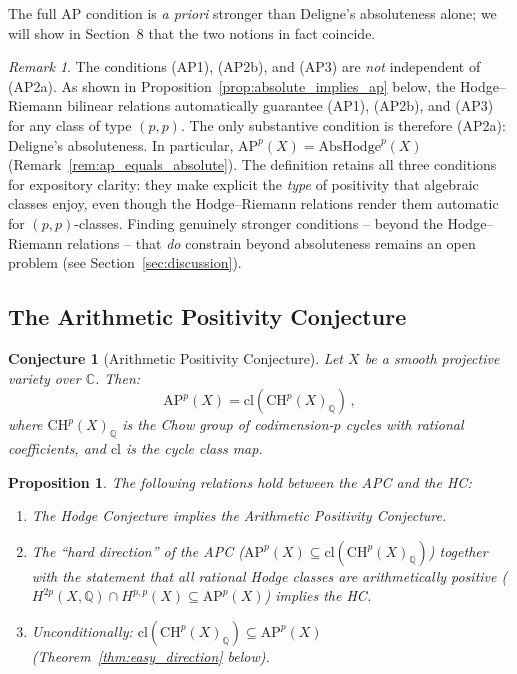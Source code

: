 \documentclass[aps,prd,twocolumn,superscriptaddress,nofootinbib]{revtex4-2}
\newtheorem{proposition}[theorem]{Proposition}
\newtheorem{conjecture}[theorem]{Conjecture}
\theoremstyle{definition}
\theoremstyle{remark}
\newtheorem{remark}[theorem]{Remark}
\begin{document}
The full AP condition is \emph{a priori} stronger than Deligne's absoluteness alone; we will show in Section~8 that the two notions in fact coincide.

\begin{remark}
\label{rem:redundancy}
The conditions (AP1), (AP2b), and (AP3) are \textit{not} independent of (AP2a). As shown in Proposition~\ref{prop:absolute_implies_ap} below, the Hodge--Riemann bilinear relations automatically guarantee (AP1), (AP2b), and (AP3) for any class of type $(p,p)$. The only substantive condition is therefore (AP2a): Deligne's absoluteness. In particular, $\mathrm{AP}^p(X) = \mathrm{AbsHodge}^p(X)$ (Remark~\ref{rem:ap_equals_absolute}). The definition retains all three conditions for expository clarity: they make explicit the \textit{type} of positivity that algebraic classes enjoy, even though the Hodge--Riemann relations render them automatic for $(p,p)$-classes. Finding genuinely stronger conditions -- beyond the Hodge--Riemann relations -- that \textit{do} constrain beyond absoluteness remains an open problem (see Section~\ref{sec:discussion}).
\end{remark}

\subsection{The Arithmetic Positivity Conjecture}

\begin{conjecture}[Arithmetic Positivity Conjecture]
\label{conj:AP}
Let $X$ be a smooth projective variety over $\mathbb{C}$. Then:
\begin{equation}
\mathrm{AP}^p(X) = \mathrm{cl}\!\left(\mathrm{CH}^p(X)_\mathbb{Q}\right)\,,
\end{equation}
where $\mathrm{CH}^p(X)_\mathbb{Q}$ is the Chow group of codimension-$p$ cycles with rational coefficients, and $\mathrm{cl}$ is the cycle class map.
\end{conjecture}

\begin{proposition}
\label{prop:equivalence}
The following relations hold between the APC and the HC:
\begin{enumerate}
\item The Hodge Conjecture implies the Arithmetic Positivity Conjecture.
\item The ``hard direction'' of the APC ($\mathrm{AP}^p(X) \subseteq \mathrm{cl}(\mathrm{CH}^p(X)_\mathbb{Q})$) together with the statement that all rational Hodge classes are arithmetically positive ($H^{2p}(X, \mathbb{Q}) \cap H^{p,p}(X) \subseteq \mathrm{AP}^p(X)$) implies the HC.
\item Unconditionally: $\mathrm{cl}(\mathrm{CH}^p(X)_\mathbb{Q}) \subseteq \mathrm{AP}^p(X)$ (Theorem~\ref{thm:easy_direction} below).
\end{enumerate}
\end{proposition}
\end{document}
